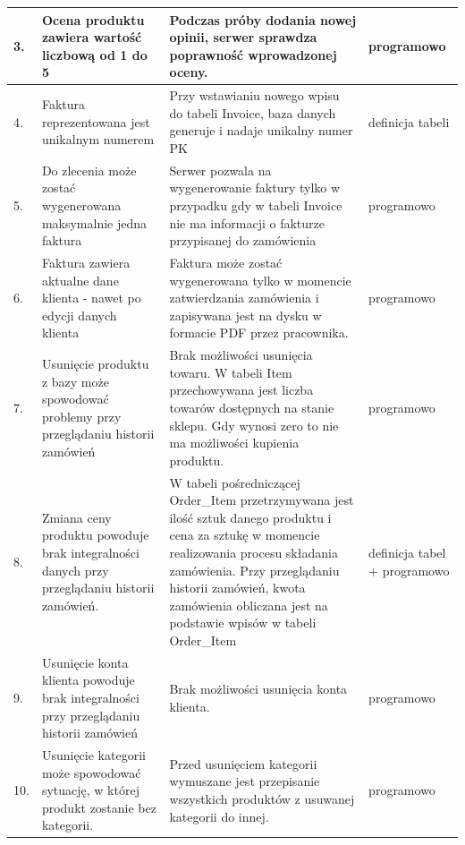 \documentclass[10pt,a4paper]{article}
\begin{document}
\begin{longtable}{| p{0.5cm} | p{4cm} | p{6cm} | p{2cm} |}
  3. & Ocena produktu zawiera wartość
       liczbową od 1 do 5				 &  Podczas próby dodania nowej opinii,
       										serwer sprawdza poprawność 
       										wprowadzonej oceny.					 & programowo\\ \hline
  4. & Faktura reprezentowana
  	   jest unikalnym numerem			 & Przy wstawianiu nowego wpisu
  	    								   do tabeli Invoice, baza danych 
  	    								   generuje i nadaje unikalny numer PK   & definicja tabeli\\ \hline
  5. & Do zlecenia może zostać
       wygenerowana maksymalnie
       jedna faktura					 & Serwer pozwala na wygenerowanie 
       									   faktury tylko w przypadku 
       									   gdy w tabeli Invoice nie ma 
       									   informacji o fakturze przypisanej
       									   do zamówienia						 & programowo\\ \hline
  6. & Faktura zawiera aktualne
       dane klienta - 
       nawet po edycji danych klienta    & Faktura może zostać wygenerowana
                                           tylko w momencie zatwierdzania
                                           zamówienia i zapisywana jest na
                                           dysku w formacie PDF
                                           przez pracownika.					 & programowo\\ \hline
  7. & Usunięcie produktu z bazy
       może spowodować problemy 
       przy przeglądaniu
       historii zamówień				 & Brak możliwości usunięcia towaru. 
       									   W tabeli Item przechowywana jest 
       									   liczba towarów dostępnych 
       									   na stanie sklepu. Gdy wynosi zero 
       									   to nie ma możliwości 
       									   kupienia produktu. 					 & programowo\\ \hline
  8. & Zmiana ceny produktu powoduje
       brak integralności danych przy
       przeglądaniu historii zamówień.   & W tabeli pośredniczącej Order\_Item
     									   przetrzymywana jest ilość sztuk
     									   danego produktu i cena za sztukę
     									   w momencie realizowania 
     									   procesu składania zamówienia. 
     									   Przy przeglądaniu historii zamówień,
     									   kwota zamówienia obliczana jest 
     									   na podstawie wpisów 
     									   w tabeli Order\_Item					 & definicja tabel + programowo\\ \hline
  9. & Usunięcie konta klienta powoduje
   	   brak integralności przy 
   	   przeglądaniu historii zamówień	 & Brak możliwości usunięcia 
   	   									   konta klienta.  					 	 & programowo\\ \hline
  10.& Usunięcie kategorii może 
  	   spowodować sytuację, 
  	   w której produkt 
  	   zostanie bez kategorii.			 & Przed usunięciem kategorii wymuszane
  	   									   jest przepisanie wszystkich produktów 
  	   									   z usuwanej kategorii do innej.		 & programowo \\ \hline
  \end{longtable}
  \newpage
\end{document}
